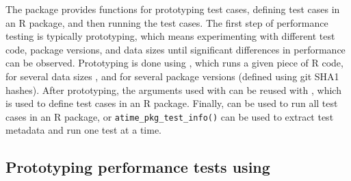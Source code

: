 The  package provides functions for prototyping test cases, defining test cases in an R package, and then running the test cases.
The first step of performance testing is typically prototyping, which means experimenting with different test code, package versions, and data sizes until significant differences in performance can be observed. 
Prototyping is done using , which runs a given piece of R code, for several data sizes , and for several package versions (defined using git SHA1 hashes).
After prototyping, the arguments used with  can be reused with , which is used to define test cases in an R package.
Finally,  can be used to run all test cases in an R package, or \verb|atime_pkg_test_info()| can be used to extract test metadata and run one test at a time.

\subsection{Prototyping performance tests using }

